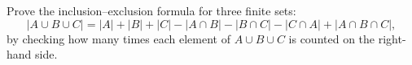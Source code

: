 Prove the inclusion--exclusion formula for three finite sets:
\[|A\cup B\cup C|=|A|+|B|+|C|-|A\cap B|-|B\cap C|-|C\cap A|+|A\cap B\cap C|,\]
by checking how many times each element of $A\cup B\cup C$ is counted on the right-hand side.
